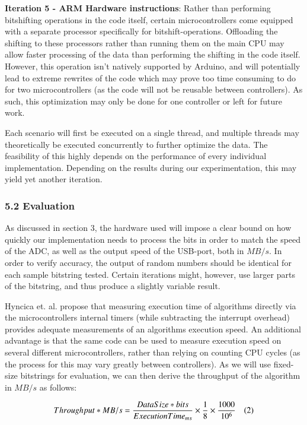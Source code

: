 \documentclass{sigchi}
\begin{document}
\textbf{Iteration 5 - ARM Hardware instructions}: Rather than performing bitshifting operations in the code itself, certain microcontrollers come equipped with a separate processor specifically for bitshift-operations. Offloading the shifting to these processors rather than running them on the main CPU may allow faster processing of the data than performing the shifting in the code itself. However, this operation isn't natively supported by Arduino, and will potentially lead to extreme rewrites of the code which may prove too time consuming to do for two microcontrollers (as the code will not be reusable between controllers). As such, this optimization may only be done for one controller or left for future work.

Each scenario will first be executed on a single thread, and multiple threads may theoretically be executed concurrently to further optimize the data. The feasibility of this highly depends on the performance of every individual implementation. Depending on the results during our experimentation, this may yield yet another iteration.

\subsubsection{5.2 Evaluation}\label{evaluation}

As discussed in section 3, the hardware used will impose a clear bound on how quickly our implementation needs to process the bits in order to match the speed of the ADC, as well as the output speed of the USB-port, both in \(MB/s\). In order to verify accuracy, the output of random numbers should be identical for each sample bitstring tested. Certain iterations might, however, use larger parts of the bitstring, and thus produce a slightly variable result.

Hyncica et. al. \cite{micromeasurements} propose that measuring execution time of algorithms directly via the microcontrollers internal timers (while subtracting the interrupt overhead) provides adequate measurements of an algorithms execution speed. An additional advantage is that the same code can be used to measure execution speed on several different microcontrollers, rather than relying on counting CPU cycles (as the process for this may vary greatly between controllers). As we will use fixed-size bitstrings for evaluation, we can then derive the throughput of the algorithm in \(MB/s\) as follows:

\[
Throughput*{MB/s} = \frac{DataSize*{bits}}{Execution Time_{ms}} \times
\frac{1}{8} \times \frac{1000}{10^6} \text{\phantom{12}(2)}
\]
\end{document}
